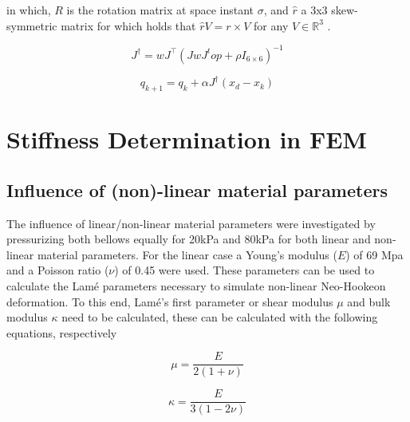 in which, $R$ is the rotation matrix at space instant $\sigma$, and $\hat{r}$ a 3x3 skew-symmetric matrix for which holds that $\hat{r}V = r \times V$ for any $V \in \mathbb{R}^3$ \cite{Boyer2019}.

\begin{equation}
    J^\dagger = wJ^\top(JwJ^top + \rho I_{6\times 6})^{-1}
\end{equation}


\begin{equation}
    q_{k+1} = q_{k} + \alpha J^\dagger (x_d - x_k)
\end{equation}
























\section{Stiffness Determination in FEM}








\subsection{Influence of (non)-linear material parameters}


The influence of linear/non-linear material parameters were investigated by pressurizing both bellows equally for 20kPa and 80kPa for both linear and non-linear material parameters. For the linear case a Young's modulus ($E$) of 69 Mpa and a Poisson ratio ($\nu$) of 0.45 were used. These parameters can be used to calculate the Lamé parameters necessary to simulate non-linear Neo-Hookeon deformation. To this end, Lamé's first parameter or shear modulus $\mu$ and bulk modulus $\kappa$ need to be calculated, these can be calculated with the following equations, respectively

\begin{equation}
    \mu = \frac{E}{2(1+\nu)}
\end{equation}


\begin{equation}
    \kappa = \frac{E}{3(1-2\nu)}
\end{equation}

